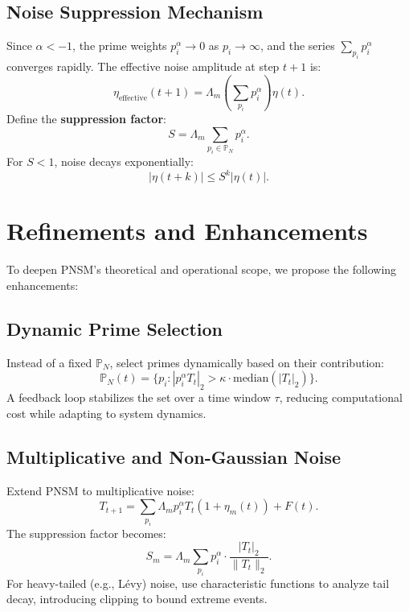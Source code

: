 \documentclass{article}
\theoremstyle{plain}
\begin{document}
\subsection{Noise Suppression Mechanism}
Since \( \alpha < -1 \), the prime weights \( p_i^\alpha \to 0 \) as \( p_i \to \infty \), and the series \( \sum_{p_i} p_i^\alpha \) converges rapidly. The effective noise amplitude at step \( t+1 \) is:
\begin{equation}
    \eta_{\text{effective}}(t+1) = \Lambda_m \left( \sum_{p_i} p_i^\alpha \right) \eta(t).
\end{equation}
Define the \textbf{suppression factor}:
\begin{equation}
    S = \Lambda_m \sum_{p_i \in \mathbb{P}_N} p_i^\alpha.
\end{equation}
For \( S < 1 \), noise decays exponentially:
\begin{equation}
    |\eta(t+k)| \leq S^k |\eta(t)|.
\end{equation}


\section{Refinements and Enhancements}
To deepen PNSM’s theoretical and operational scope, we propose the following enhancements:

\subsection{Dynamic Prime Selection}
Instead of a fixed \( \mathbb{P}_N \), select primes dynamically based on their contribution:
\begin{equation}
    \mathbb{P}_N(t) = \{ p_i : |p_i^\alpha T_t|_2 > \kappa \cdot \text{median}(|T_t|_2) \}.
\end{equation}
A feedback loop stabilizes the set over a time window \( \tau \), reducing computational cost while adapting to system dynamics.

\subsection{Multiplicative and Non-Gaussian Noise}
Extend PNSM to multiplicative noise:
\begin{equation}
    T_{t+1} = \sum_{p_i} \Lambda_m p_i^\alpha T_t (1 + \eta_m(t)) + F(t).
\end{equation}
The suppression factor becomes:
\begin{equation}
    S_m = \Lambda_m \sum_{p_i} p_i^\alpha \cdot \frac{|T_t|_2}{\|T_t\|_2}.
\end{equation}
For heavy-tailed (e.g., Lévy) noise, use characteristic functions to analyze tail decay, introducing clipping to bound extreme events.
\end{document}
